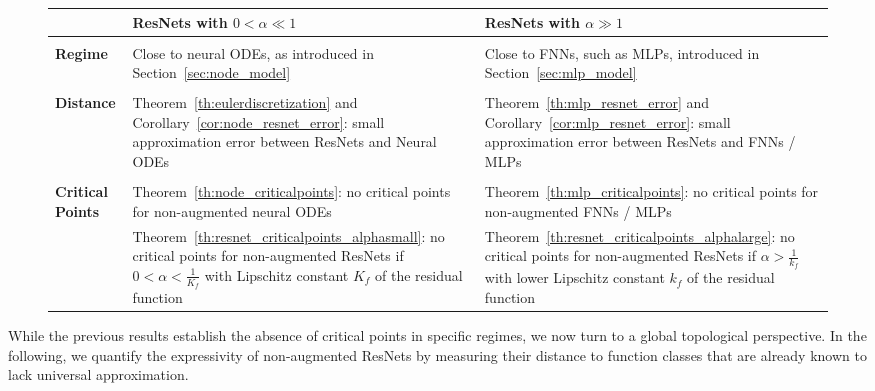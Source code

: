 \documentclass[10pt]{article}
\theoremstyle{definition}
\numberwithin{equation}{section}
\begin{document}
\begin{figure}[h]
    \vspace{4mm}
	\begin{tabular*}{\textwidth}{p{2cm}|p{6.1cm}|p{6.1cm}}
		& \hspace{11mm}\textbf{ResNets with $0<\alpha \ll 1$} & \hspace{12mm} \textbf{ResNets with $\alpha \gg 1$} \\[5pt]
		\hline && \\[-5pt]
		\textbf{Regime}
		&
		Close to neural ODEs, as introduced in Section~\ref{sec:node_model}
        \vspace{5pt} 
		&
		Close to FNNs, such as MLPs, introduced in Section~\ref{sec:mlp_model}
		\vspace{5pt} \\
		\hline &&  \\[-5pt]
		\textbf{Distance}
		&
		  Theorem~\ref{th:eulerdiscretization} and Corollary~\ref{cor:node_resnet_error}: small approximation error between ResNets and Neural ODEs
		  \vspace{5pt}
		& 
		Theorem~\ref{th:mlp_resnet_error} and Corollary~\ref{cor:mlp_resnet_error}: small approximation error between ResNets and FNNs / MLPs
		\vspace{5pt} \\
        \hline &&  \\[-5pt]
        \textbf{Critical Points}
		& 
		Theorem~\ref{th:node_criticalpoints}: no critical points for non-augmented neural ODEs 
		&
		Theorem~\ref{th:mlp_criticalpoints}: no critical points for non-augmented FNNs / MLPs \\[5mm]
        & Theorem~\ref{th:resnet_criticalpoints_alphasmall}:  no critical points for non-augmented ResNets if  $0 < \alpha < \frac{1}{K_f}$ with Lipschitz constant $K_f$ of the residual function  & 
        Theorem~\ref{th:resnet_criticalpoints_alphalarge}:  no critical points for non-augmented ResNets if  $\alpha > \frac{1}{k_f}$ with lower Lipschitz constant $k_f$ of the residual function\\
	\end{tabular*}
	 \label{tab:results}
\end{figure}

While the previous results establish the absence of critical points in specific regimes, we now turn to a global topological perspective. In the following, we quantify the expressivity of non-augmented ResNets by measuring their distance to function classes that are already known to lack universal approximation.
\end{document}
